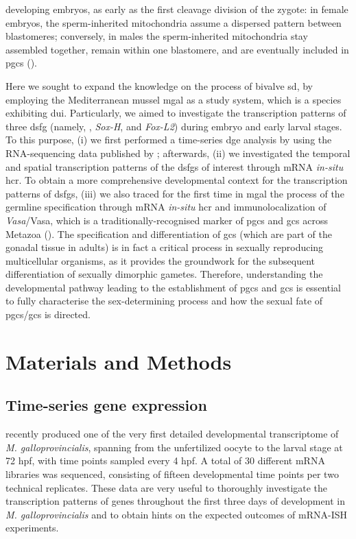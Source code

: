 developing embryos, as early as the first cleavage division of the zygote: in female embryos, the sperm-inherited mitochondria assume a dispersed pattern between blastomeres; conversely, in males the sperm-inherited mitochondria stay assembled together, remain within one blastomere, and are eventually included in \glspl{pgc} ().

Here we sought to expand the knowledge on the process of bivalve \gls{sd}, by employing the Mediterranean mussel \gls{mgal} as a study system, which is a species exhibiting \gls{dui}. Particularly, we aimed to investigate the transcription patterns of three \gls{dsfg} (namely, , \textit{Sox-H}, and \textit{Fox-L2}) during embryo and early larval stages. To this purpose, (i) we first performed a time-series \gls{dge} analysis by using the RNA-sequencing data published by ; afterwards, (ii) we investigated the temporal and spatial transcription patterns of the \glspl{dsfg} of interest through mRNA \textit{in-situ} \gls{hcr}. To obtain a more comprehensive developmental context for the transcription patterns of \glspl{dsfg}, (iii) we also traced for the first time in \gls{mgal} the process of the germline specification through mRNA \textit{in-situ} \gls{hcr} and immunolocalization of \textit{Vasa}/Vasa, which is a traditionally-recognised marker of \glspl{pgc} and \glspl{gc} across Metazoa (). The specification and differentiation of \glspl{gc} (which are part of the gonadal tissue in adults) is in fact a critical process in sexually reproducing multicellular organisms, as it provides the groundwork for the subsequent differentiation of sexually dimorphic gametes. Therefore, understanding the developmental pathway leading to the establishment of \glspl{pgc} and \glspl{gc} is essential to fully characterise the sex-determining process and how the sexual fate of \glspl{pgc}/\glspl{gc} is directed.

\section{Materials and Methods} \label{chapter4_MM}
\subsection{Time-series gene expression} \label{chapter4_MM_rnaseq}
\textbf{} recently produced one of the very first detailed developmental transcriptome of \textit{M. galloprovincialis}, spanning from the unfertilized oocyte to the larval stage at 72 hpf, with time points sampled every 4 hpf. A total of 30 different mRNA libraries was sequenced, consisting of fifteen developmental time points per two technical replicates. These data are very useful to thoroughly investigate the transcription patterns of genes throughout the first three days of development in \textit{M. galloprovincialis} and to obtain hints on the expected outcomes of mRNA-ISH experiments.

